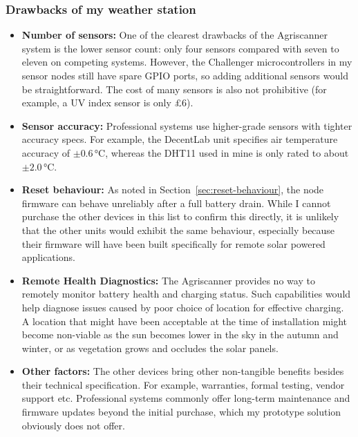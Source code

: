 \subsubsection{Drawbacks of my weather station}

\begin{itemize}
  \item \textbf{Number of sensors:} One of the clearest drawbacks of the
        Agriscanner system is the lower sensor count: only four sensors compared
        with seven to eleven on competing systems. However, the Challenger
        microcontrollers in my sensor nodes still have spare GPIO ports, so
        adding additional sensors would be straightforward. The cost of many
        sensors is also not prohibitive (for example, a UV index sensor is only
        \pounds{}6).
  \item \textbf{Sensor accuracy:} Professional systems use higher-grade sensors
        with tighter accuracy specs. For example, the DecentLab unit specifies
        air temperature accuracy of $\pm0.6\,\si{\celsius}$, whereas the DHT11
        used in mine is only rated to about $\pm2.0\,\si{\celsius}$.
  \item \textbf{Reset behaviour:} As noted in Section~\ref{sec:reset-behaviour},
        the node firmware can behave unreliably after a full battery drain.
        While I cannot purchase the other devices in this list to confirm this
        directly, it is unlikely that the other units would exhibit the same
        behaviour, especially because their firmware will have been built
        specifically for remote solar powered applications.
  \item \textbf{Remote Health Diagnostics:} The Agriscanner provides no way to
        remotely monitor battery health and charging status. Such capabilities
        would help diagnose issues caused by poor choice of location for
        effective charging. A location that might have been acceptable at the
        time of installation might become non-viable as the sun becomes lower in
        the sky in the autumn and winter, or as vegetation grows and occludes
        the solar panels.
  \item \textbf{Other factors:} The other devices bring other non-tangible
        benefits besides their technical specification. For example, warranties,
        formal testing, vendor support etc. Professional systems commonly offer
        long-term maintenance and firmware updates beyond the initial purchase,
        which my prototype solution obviously does not offer.
\end{itemize}

